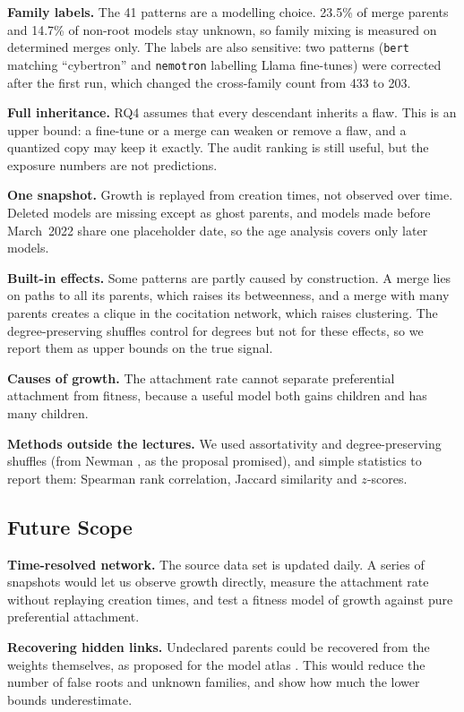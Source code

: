 \documentclass[conference]{IEEEtran}
\begin{document}
\textbf{Family labels.} The 41 patterns are a modelling choice. 23.5\% of merge
parents and 14.7\% of non-root models stay unknown, so family mixing is
measured on determined merges only. The labels are also sensitive: two patterns
(\texttt{bert} matching ``cybertron'' and \texttt{nemotron} labelling Llama
fine-tunes) were corrected after the first run, which changed the cross-family
count from 433 to 203.

\textbf{Full inheritance.} RQ4 assumes that every descendant inherits a flaw.
This is an upper bound: a fine-tune or a merge can weaken or remove a flaw, and
a quantized copy may keep it exactly. The audit ranking is still useful, but
the exposure numbers are not predictions.

\textbf{One snapshot.} Growth is replayed from creation times, not observed
over time. Deleted models are missing except as ghost parents, and models made
before March~2022 share one placeholder date, so the age analysis covers only
later models.

\textbf{Built-in effects.} Some patterns are partly caused by construction. A
merge lies on paths to all its parents, which raises its betweenness, and a
merge with many parents creates a clique in the cocitation network, which
raises clustering. The degree-preserving shuffles control for degrees but not
for these effects, so we report them as upper bounds on the true signal.

\textbf{Causes of growth.} The attachment rate cannot separate preferential
attachment from fitness, because a useful model both gains children and has
many children.

\textbf{Methods outside the lectures.} We used assortativity and
degree-preserving shuffles (from Newman \cite{newman2010}, as the proposal
promised), and simple statistics to report them: Spearman rank correlation,
Jaccard similarity and $z$-scores.

\subsection{Future Scope}

\textbf{Time-resolved network.} The source data set is updated daily. A series
of snapshots would let us observe growth directly, measure the attachment rate
without replaying creation times, and test a fitness model of growth
\cite{barabasi2016} against pure preferential attachment.

\textbf{Recovering hidden links.} Undeclared parents could be recovered from the
weights themselves, as proposed for the model atlas \cite{horwitz2025}. This
would reduce the number of false roots and unknown families, and show how much
the lower bounds underestimate.
\end{document}

